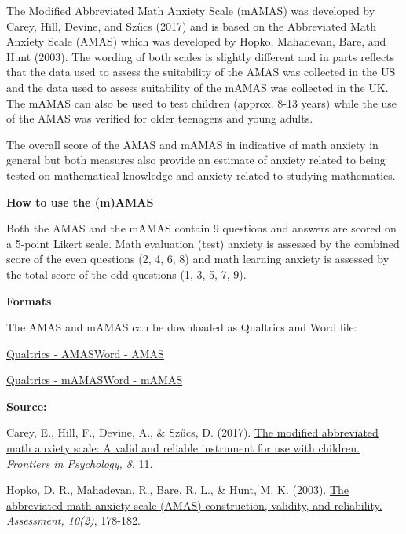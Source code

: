 \documentclass[
]{book}
\begin{document}
The Modified Abbreviated Math Anxiety Scale (mAMAS) was developed by Carey, Hill, Devine, and Szűcs (2017) and is based on the Abbreviated Math Anxiety Scale (AMAS) which was developed by Hopko, Mahadevan, Bare, and Hunt (2003). The wording of both scales is slightly different and in parts reflects that the data used to assess the suitability of the AMAS was collected in the US and the data used to assess suitability of the mAMAS was collected in the UK. The mAMAS can also be used to test children (approx. 8-13 years) while the use of the AMAS was verified for older teenagers and young adults.

The overall score of the AMAS and mAMAS in indicative of math anxiety in general but both measures also provide an estimate of anxiety related to being tested on mathematical knowledge and anxiety related to studying mathematics.

\textbf{How to use the (m)AMAS}

Both the AMAS and the mAMAS contain 9 questions and answers are scored on a 5-point Likert scale. Math evaluation (test) anxiety is assessed by the combined score of the even questions (2, 4, 6, 8) and math learning anxiety is assessed by the total score of the odd questions (1, 3, 5, 7, 9).

\textbf{Formats}

The AMAS and mAMAS can be downloaded as Qualtrics and Word file:

\href{questionnaires/AbbreviatedMathAnxietyScale.qsf}{Qualtrics - AMAS}\textbar{}\href{questionnaires/AbbreviatedMathAnxietyScale.docx}{Word - AMAS}

\href{questionnaires/ModifiedAbbreviatedMathAnxietyScale.qsf}{Qualtrics - mAMAS}\textbar{}\href{questionnaires/ModifiedAbbreviatedMathAnxietyScale.docx}{Word - mAMAS}

\textbf{Source:}

Carey, E., Hill, F., Devine, A., \& Szűcs, D. (2017). \href{https://www.frontiersin.org/articles/10.3389/fpsyg.2017.00011/full}{The modified abbreviated math anxiety scale: A valid and reliable instrument for use with children.} \emph{Frontiers in Psychology, 8}, 11.

Hopko, D. R., Mahadevan, R., Bare, R. L., \& Hunt, M. K. (2003). \href{https://www.researchgate.net/profile/Stephen_Joy/post/Hello_Can_anyone_tell_me_how_to_access_the_Abbreviated_Math_Anxiety_Scale_developed_by_Derek_Hopko2/attachment/59d624eb79197b80779833c8/AS:315374518636545@1452202552608/download/Math+Anxiety+Scale+Abbreviated+2003.pdf}{The abbreviated math anxiety scale (AMAS) construction, validity, and reliability.} \emph{Assessment, 10(2)}, 178-182.
\end{document}
